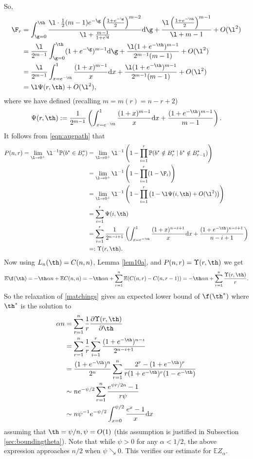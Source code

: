 \documentclass[12pt]{article}
\newcommand{\1}{\textbf{1}}
\def\nn{\nonumber}
\def\a{\alpha} \def\b{\beta} \def\d{\delta} \def\D{\Delta}
\newcommand{\brac}[1]{\left(#1\right)}
\newcommand{\bfrac}[2]{\left(\frac{#1}{#2}\right)}
\def\dd{\text{d}}
\def\E{\mathbb{E}}
\def\Pr{\mathbb{P}}
\newcommand{\beq}[2]{\begin{equation}\label{#1}#2\end{equation}}
\def\nn{\nonumber}
\begin{document}
So,
\begin{align*}
  \F_r&=\int_{\g=0}^\th\frac{\l\cdot \frac12(m-1)e^{-\g}\bfrac{1+e^{-\g}}{2}^{m-2}}{\l+\frac{m-1}{1+e^\g}}\dd\g +\frac{\l\bfrac{1+e^{-\th}}{2}^{m-1}}{\l+m-1}+O(\l^2)\\
  &=\frac{\l}{2^{m-1}}\int_{\g=0}^\th(1+e^{-\g})^{m-1}\dd\g+\frac{\l(1+e^{-\th})^{m-1}}{2^{m-1}(m-1)}+O(\l^2)\\
  &=\frac{\l}{2^{m-1}}\int_{x=e^{-\th}}^1\frac{(1+x)^{m-1}}{x}\dd x+\frac{\l(1+e^{-\th})^{m-1}}{2^{m-1}(m-1)}+O(\l^2)\\
&=\l\Psi(r,\th)+O(\l^2),
\end{align*}
where we have defined (recalling $m=m(r) = n-r +2$)
\[
\Psi(r,\th):= \frac{1}{2^{m-1}}\brac{\int_{x=e^{-\th}}^1\frac{(1+x)^{m-1}}{x}\dd x+\frac{(1+e^{-\th})^{m-1}}{m-1}}.
\]
  It follows from \eqref{eqn:augpath} that
\begin{align}
 P(n, r) =  \lim_{\l\to0^+}\l^{-1}\Pr(b^*\in B_r^*)& = \lim_{\l\to0^+}\l^{-1}\brac{1-\prod_{i=1}^r\Pr(b^* \notin B_r^* \mid b^* \notin B_{r-1}^*)}\nn\\
 &=\lim_{\l\to0^+}\l^{-1}\brac{1-\prod_{i=1}^r(1-\F_i)}\nn\\
 &= \lim_{\l\to0^+}\l^{-1}\brac{1-\prod_{i=1}^r\brac{1-\l\Psi(i,\th)+O(\l^2)}}\nn\\
  &=\sum_{i=1}^r\Psi(i,\th)\nn\\
  &=\sum_{i=1}^r\frac{1}{2^{n-i+1}}\brac{\int_{x=e^{-\th}}^1\frac{(1+x)^{n-i+1}}{x}\dd x+\frac{(1+e^{-\th})^{n-i+1}}{n-i+1}}\label{Ups}\\
&=:\Upsilon(r,\th).\nn
\end{align}
Now using  $L_n(\th) = C(n, n)$, Lemma \ref{lem10a}, and $P(n, r) = \Upsilon(r, \th)$ we get
\beq{Efth}{
\E\f(\th) = -\th \a n + \E C(n, n) =-\th \a n + \sum_{r=1}^n  \E(C(n, r) - C(n, r-1)) =-\th\a n+\sum_{r=1}^n\frac{\Upsilon(r,\th)}{r}.
}
So the relaxation of \eqref{matchings} gives an expected lower bound of $\f(\th^*)$ where $\th^*$ is the solution to
\begin{align*}
  \a n&= \sum_{r=1}^n\frac{1}{r}\frac{\partial \Upsilon(r,\th)}{\partial \th}\\
      &=\sum_{r=1}^n\frac{1}{r}\sum_{i=1}^r\frac{(1+e^{-\th})^{n-i}}{2^{n-i+1}}\\
      &=\frac{(1+e^{-\th})^n}{2^{n}}\sum_{r=1}^n\frac{2^{r}-(1+e^{-\th})^{r}}{r(1+e^{-\th})^r(1-e^{-\th})}\\
      &\sim ne^{-\psi/2}\sum_{r=1}^n\frac{e^{\psi r/2n}-1}{r\psi}\\
  &\sim n\psi^{-1} e^{-\psi/2}\int_{x=0}^{\psi/2}\frac{e^{x}-1}{x}\dd x
\end{align*}
assuming that $\th=\psi/n,\psi=O(1)$ (this assumption is justified in Subsection \ref{sec:boundingtheta}). Note that while $\psi > 0$ for any $\a < 1/2$, the above expression approaches $n/2$ when $\psi \searrow 0$. This verifies our estimate for $\E Z_\a$.
\end{document}
